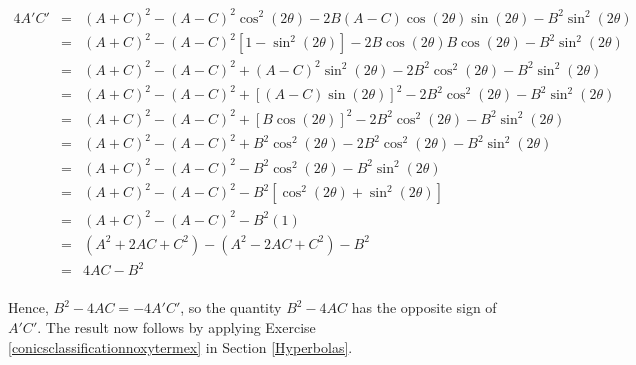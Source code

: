 \documentclass{ximera}
\begin{document}
\[ \begin{array}{rcl}

4A'C' & = & (A+C)^2 - (A-C)^2 \cos^{2}(2\theta) -2B(A-C)\cos(2\theta)\sin(2\theta) -B^2\sin^2(2\theta) \\ [3pt]
      & = & (A+C)^2 - (A-C)^2 \left[ 1-\sin^{2}(2\theta)\right] -2B\cos(2\theta) B \cos(2\theta) -B^2\sin^2(2\theta) \\ [3pt]
      & = & (A+C)^2 - (A-C)^2  + (A-C)^2 \sin^{2}(2\theta) -2B^2\cos^{2}(2\theta) -B^2\sin^2(2\theta) \\ [3pt]   
      & = & (A+C)^2 - (A-C)^2  +\left[(A-C) \sin(2\theta)\right]^2 -2B^2\cos^{2}(2\theta) -B^2\sin^2(2\theta)  \\ [3pt]    
      & = & (A+C)^2 - (A-C)^2  +\left[B \cos(2\theta)\right]^2 -2B^2\cos^{2}(2\theta) -B^2\sin^2(2\theta)  \\ [3pt]      
      & = & (A+C)^2 - (A-C)^2  +B^2\cos^{2}(2\theta) -2B^2\cos^{2}(2\theta) -B^2\sin^2(2\theta)  \\ [3pt]   
      & = & (A+C)^2 - (A-C)^2  -B^2\cos^{2}(2\theta) -B^2\sin^2(2\theta)  \\ [3pt] 
		  & = & (A+C)^2 - (A-C)^2  -B^2\left[\cos^{2}(2\theta)+ \sin^2(2\theta)\right]  \\ [3pt]  
		  & = & (A+C)^2 - (A-C)^2  -B^2 (1) \\ [3pt] 
	  	& = & \left(A^2 + 2AC+C^2\right) - \left(A^2 - 2AC+C^2\right)  -B^2  \\ [3pt] 			    			
	  	& = & 4AC  -B^2  \\ [3pt] 		
\end{array} \]

Hence, $B^2 - 4AC = -4 A'C'$, so the quantity $B^2 - 4AC$ has the opposite sign of $A'C'$.  The result now follows by applying  Exercise \ref{conicsclassificationnoxytermex} in Section \ref{Hyperbolas}.
\end{document}
